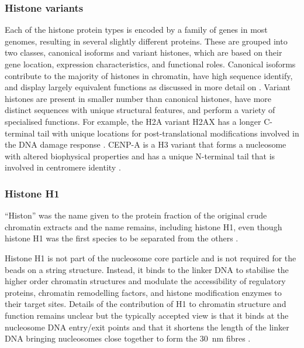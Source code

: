     \subsubsection{Histone variants}

      Each of the histone protein types is encoded by a family
      of genes in most genomes,
      resulting in several slightly different proteins.
      These are grouped into two classes, canonical isoforms
      and variant histones, which are based on their gene location,
      expression characteristics, and functional roles.
      Canonical isoforms contribute to the majority
      of histones in chromatin, have high sequence identify, and display
      largely equivalent functions as discussed in more detail on
      .
      Variant histones are present in smaller number than canonical
      histones, have more distinct sequences with unique structural features,
      and perform a variety of specialised functions.  For example, the
      H2A variant H2AX has a longer C-terminal tail with unique locations
      for post-translational modifications involved in the DNA damage
      response \citep{our-H2AX-review}.  CENP-A is a H3 variant that
      forms a nucleosome with altered biophysical properties
      and has a unique N-terminal
      tail that is involved in centromere identity \citep{black2011-cenpa}.

    \subsubsection{Histone H1}

      ``Histon'' was the name given to the protein fraction of
      the original crude chromatin extracts
      \citep{kossel1884-histones}
      and the name remains, including histone H1,
      even though histone H1 was the first species to be separated from
      the others \citep{stedman1951main-histones-separation}.

      Histone H1 is not part of the nucleosome core particle and is not
      required for the beads on a string structure.
      Instead, it binds to the linker DNA
      to stabilise the higher order
      chromatin structures and modulate the accessibility of
      regulatory proteins,
      chromatin remodelling factors, and histone modification enzymes
      to their target sites.
      Details
      of the contribution of H1 to chromatin structure and function remains
      unclear but the typically accepted view is that it binds at
      the nucleosome DNA entry/exit points and that it shortens the
      length of the linker DNA bringing nucleosomes close together
      to form the \SI{30}{\nm} fibres \citep{harshman2013h1-review}.

